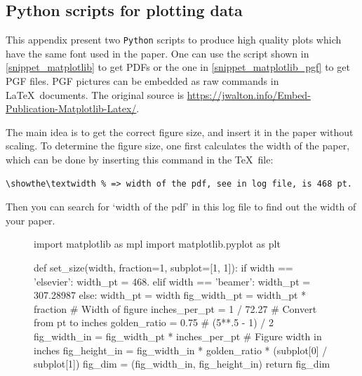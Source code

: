 \documentclass[authoryear,12pta4paper,fleqn]{article}
\numberwithin{equation}{section}
\theoremstyle{remark}
\begin{document}
\begin{appendices}
%

\section{Python scripts for plotting data}\label{sec:scripts}

This appendix present two \texttt{Python} scripts to produce high quality plots which have the same font used in the paper. One can use the script shown in \cref{snippet_matplotlib} to get PDFs or the one in \cref{snippet_matplotlib_pgf} to get PGF files. PGF pictures can be embedded as raw commands in \LaTeX\ documents. The original source is \url{https://jwalton.info/Embed-Publication-Matplotlib-Latex/}.

The main idea is to get the correct figure size, and insert it in the paper without scaling. To determine the figure size, one first calculates the width of the paper, which can be done by inserting this command in the \TeX\ file:


\begin{verbatim}
\showthe\textwidth % => width of the pdf, see in log file, is 468 pt. 
\end{verbatim}
Then you can search for `width of the pdf' in this log file to find out the width of your paper.

\begin{figure}[!h]
  \begin{snippet}[caption={Python script for plotting data.},label={snippet_matplotlib},framerule=1pt,tabsize=3]   
    import matplotlib as mpl
    import matplotlib.pyplot as plt

    def set_size(width, fraction=1, subplot=[1, 1]):
        if width == 'elsevier':
            width_pt = 468.
        elif width == 'beamer':
            width_pt = 307.28987
        else:
            width_pt = width
        fig_width_pt = width_pt * fraction      # Width of figure
        inches_per_pt = 1 / 72.27               # Convert from pt to inches
        golden_ratio = 0.75                     # (5**.5 - 1) / 2
        fig_width_in = fig_width_pt * inches_per_pt  # Figure width in inches
        fig_height_in = fig_width_in * golden_ratio * (subplot[0] / subplot[1])
        fig_dim = (fig_width_in, fig_height_in)
        return fig_dim


\end{snippet}
\end{figure}
\end{appendices}
\end{document}
